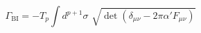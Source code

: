 \begin{equation}\label{abi}
    \Gamma_{\mathrm{BI}}
    =-T_p\int d^{p+1}\!\sigma\,\,
    \sqrt{
        \det(
            \delta_{{\mu}{\nu}}-2\pi\alpha'F_{{\mu}{\nu}})}
\end{equation}

